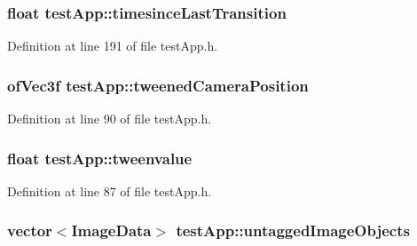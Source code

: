 \hypertarget{classtest_app_acb60fb8a89e9ec5d461630a20b11ceda}{
\subsubsection[{timesince\-Last\-Transition}]{\setlength{\rightskip}{0pt plus 5cm}float test\-App\-::timesince\-Last\-Transition}}\label{classtest_app_acb60fb8a89e9ec5d461630a20b11ceda}


Definition at line 191 of file test\-App.\-h.

\hypertarget{classtest_app_ae9f60797c1c5d9f1ac06e1d6a5259957}{
\subsubsection[{tweened\-Camera\-Position}]{\setlength{\rightskip}{0pt plus 5cm}of\-Vec3f test\-App\-::tweened\-Camera\-Position}}\label{classtest_app_ae9f60797c1c5d9f1ac06e1d6a5259957}


Definition at line 90 of file test\-App.\-h.

\hypertarget{classtest_app_add9ab1aa902948afbdf1c6db0dfde385}{
\subsubsection[{tweenvalue}]{\setlength{\rightskip}{0pt plus 5cm}float test\-App\-::tweenvalue}}\label{classtest_app_add9ab1aa902948afbdf1c6db0dfde385}


Definition at line 87 of file test\-App.\-h.

\hypertarget{classtest_app_ae31cc868f554f62b4c6e4e9db3b4155b}{
\subsubsection[{untagged\-Image\-Objects}]{\setlength{\rightskip}{0pt plus 5cm}vector$<${\bf Image\-Data}$>$ test\-App\-::untagged\-Image\-Objects}}\label{classtest_app_ae31cc868f554f62b4c6e4e9db3b4155b}


